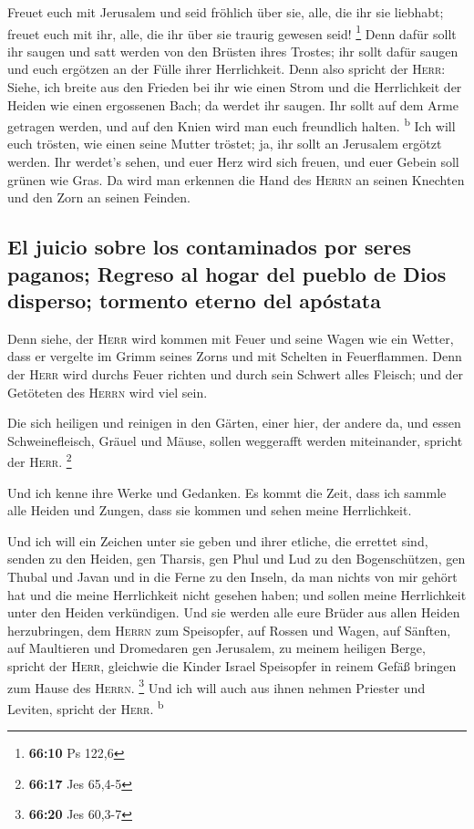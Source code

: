  Freuet euch mit Jerusalem und seid fröhlich über sie,
alle, die ihr sie liebhabt; freuet euch mit ihr, alle, die ihr über sie
traurig gewesen seid! \footnote{\textbf{66:10} Ps 122,6} 
Denn dafür sollt ihr saugen und satt werden von den Brüsten ihres
Trostes; ihr sollt dafür saugen und euch ergötzen an der Fülle ihrer
Herrlichkeit.  Denn also spricht der \textsc{Herr}:
Siehe, ich breite aus den Frieden bei ihr wie einen Strom und die
Herrlichkeit der Heiden wie einen ergossenen Bach; da werdet ihr saugen.
Ihr sollt auf dem Arme getragen werden, und auf den Knien wird man euch
freundlich halten. \textsuperscript{b}  Ich will euch
trösten, wie einen seine Mutter tröstet; ja, ihr sollt an Jerusalem
ergötzt werden.  Ihr werdet's sehen, und euer Herz wird
sich freuen, und euer Gebein soll grünen wie Gras. Da wird man erkennen
die Hand des \textsc{Herrn} an seinen Knechten und den Zorn an seinen
Feinden.

\hypertarget{el-juicio-sobre-los-contaminados-por-seres-paganos-regreso-al-hogar-del-pueblo-de-dios-disperso-tormento-eterno-del-apuxf3stata}{%
\subsection{El juicio sobre los contaminados por seres paganos; Regreso
al hogar del pueblo de Dios disperso; tormento eterno del
apóstata}\label{el-juicio-sobre-los-contaminados-por-seres-paganos-regreso-al-hogar-del-pueblo-de-dios-disperso-tormento-eterno-del-apuxf3stata}}

 Denn siehe, der \textsc{Herr} wird kommen mit Feuer und
seine Wagen wie ein Wetter, dass er vergelte im Grimm seines Zorns und
mit Schelten in Feuerflammen.  Denn der \textsc{Herr}
wird durchs Feuer richten und durch sein Schwert alles Fleisch; und der
Getöteten des \textsc{Herrn} wird viel sein.

 Die sich heiligen und reinigen in den Gärten, einer
hier, der andere da, und essen Schweinefleisch, Gräuel und Mäuse, sollen
weggerafft werden miteinander, spricht der \textsc{Herr}. \footnote{\textbf{66:17}
  Jes 65,4-5}

 Und ich kenne ihre Werke und Gedanken. Es kommt die
Zeit, dass ich sammle alle Heiden und Zungen, dass sie kommen und sehen
meine Herrlichkeit.

 Und ich will ein Zeichen unter sie geben und ihrer
etliche, die errettet sind, senden zu den Heiden, gen Tharsis, gen Phul
und Lud zu den Bogenschützen, gen Thubal und Javan und in die Ferne zu
den Inseln, da man nichts von mir gehört hat und die meine Herrlichkeit
nicht gesehen haben; und sollen meine Herrlichkeit unter den Heiden
verkündigen.  Und sie werden alle eure Brüder aus allen
Heiden herzubringen, dem \textsc{Herrn} zum Speisopfer, auf Rossen und
Wagen, auf Sänften, auf Maultieren und Dromedaren gen Jerusalem, zu
meinem heiligen Berge, spricht der \textsc{Herr}, gleichwie die Kinder
Israel Speisopfer in reinem Gefäß bringen zum Hause des \textsc{Herrn}.
\footnote{\textbf{66:20} Jes 60,3-7}  Und ich will auch
aus ihnen nehmen Priester und Leviten, spricht der \textsc{Herr}.
\textsuperscript{b}

